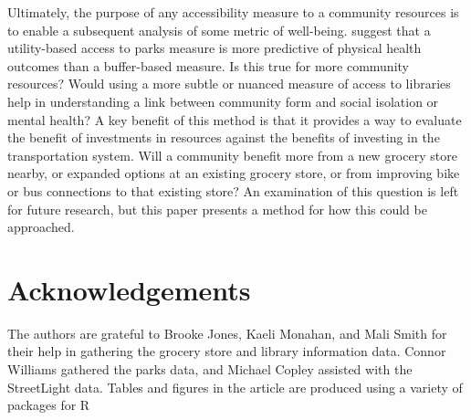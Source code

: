 \documentclass[3p, authoryear, review]{elsarticle} %
\begin{document}
Ultimately, the purpose of any accessibility measure to a community resources
is to enable a subsequent analysis of some metric of well-being. \citet{macfarlane2020}
suggest that a utility-based access to parks measure is more predictive of
physical health outcomes than a buffer-based measure. Is this true for more
community resources? Would using a more subtle or nuanced measure of access to
libraries help in understanding a link between community form and social isolation
or mental health? A key benefit of this method is that it provides a way to
evaluate the benefit of investments in resources against the benefits of investing
in the transportation system. Will a community benefit more from a new grocery store
nearby, or expanded options at an existing grocery store, or from improving bike
or bus connections to that existing store? An examination of this question is
left for future research, but this paper presents a method for how this could be
approached.

\hypertarget{acknowledgements}{%
\section*{Acknowledgements}\label{acknowledgements}}

The authors are grateful to Brooke Jones, Kaeli Monahan, and Mali Smith for their help in gathering the grocery store and library information data. Connor Williams gathered the parks data, and Michael Copley assisted with the StreetLight data. Tables and figures in the article are produced using a variety of packages for R \citep{modelsummary, ggspatial}


\end{document}
